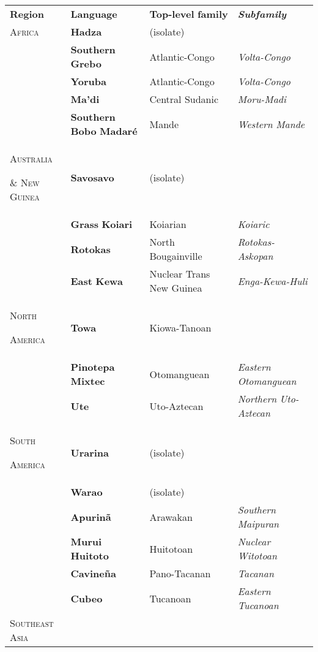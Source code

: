 \begin{table}
\begin{tabularx}{\textwidth}{XXXX}
\lsptoprule

\textbf{Region} & \textbf{Language} & \textbf{Top-level} \textbf{family} & \textbf{\textit{Subfamily}}\\
\textsc{Africa} & \textbf{Hadza} & (isolate) & \\
\hhline{-~~~} & \textbf{Southern} \textbf{Grebo} & Atlantic-Congo & \textit{Volta-Congo}\\
& \textbf{Yoruba} & Atlantic-Congo & \textit{Volta-Congo}\\
& \textbf{Ma’di} & Central Sudanic & \textit{Moru-Madi}\\
& \textbf{Southern} \textbf{Bobo} \textbf{Madaré} & Mande & \textit{Western} \textit{Mande}\\
\textsc{Australia} 

\textsc{\&} \textsc{New} \textsc{Guinea} & \textbf{Savosavo} & (isolate) & \\
\hhline{-~~~} & \textbf{Grass} \textbf{Koiari} & Koiarian & \textit{Koiaric}\\
& \textbf{Rotokas} & North Bougainville & \textit{Rotokas-Askopan}\\
& \textbf{East} \textbf{Kewa} & Nuclear Trans New Guinea & \textit{Enga-Kewa-Huli}\\
\textsc{North} 

\textsc{America} & \textbf{Towa} & Kiowa-Tanoan & \\
\hhline{-~~~} & \textbf{Pinotepa} \textbf{Mixtec} & Otomanguean & \textit{Eastern} \textit{Otomanguean}\\
& \textbf{Ute} & Uto-Aztecan & \textit{Northern} \textit{Uto-Aztecan}\\
\textsc{South} 

\textsc{America} & \textbf{Urarina} & (isolate) & \\
\hhline{-~~~} & \textbf{Warao} & (isolate) & \\
& \textbf{Apurinã} & Arawakan & \textit{Southern} \textit{Maipuran}\\
& \textbf{Murui} \textbf{Huitoto} & Huitotoan & \textit{Nuclear} \textit{Witotoan}\\
& \textbf{Cavineña} & Pano-Tacanan & \textit{Tacanan}\\
& \textbf{Cubeo} & Tucanoan & \textit{Eastern} \textit{Tucanoan}\\
\textsc{Southeast} \textsc{Asia} 


\end{tabularx}
\end{table}
